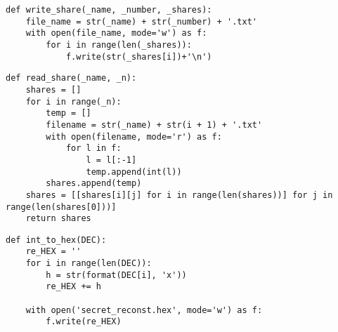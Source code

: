 \documentclass[10pt, a4paper, titlepage]{jsreport}
\begin{document}
	\begin{lstlisting}[caption=file\_output.py, label=output]
def write_share(_name, _number, _shares):
    file_name = str(_name) + str(_number) + '.txt'
    with open(file_name, mode='w') as f:
        for i in range(len(_shares)):
            f.write(str(_shares[i])+'\n')
	\end{lstlisting}

	\begin{lstlisting}[caption=file\_read.py, label=read]
def read_share(_name, _n):
    shares = []
    for i in range(_n):
        temp = []
        filename = str(_name) + str(i + 1) + '.txt'
        with open(filename, mode='r') as f:
            for l in f:
                l = l[:-1]
                temp.append(int(l))
        shares.append(temp)
    shares = [[shares[i][j] for i in range(len(shares))] for j in range(len(shares[0]))]
    return shares
	\end{lstlisting}

	\begin{lstlisting}[caption=file\_reconst.py, label=reconst]
def int_to_hex(DEC):
    re_HEX = ''
    for i in range(len(DEC)):
        h = str(format(DEC[i], 'x'))
        re_HEX += h

    with open('secret_reconst.hex', mode='w') as f:
        f.write(re_HEX)
	\end{lstlisting}
\end{document}
